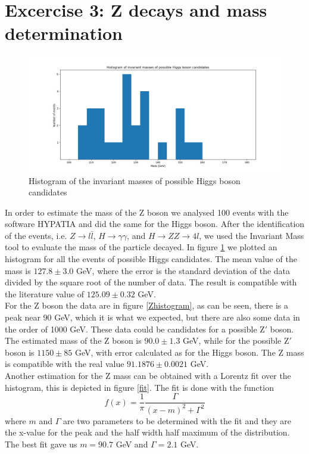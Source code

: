 \documentclass[a4paper,10pt]{article}
\begin{document}
\section{Excercise 3: Z decays and mass determination}
\begin{figure}[H]
\centering
\includegraphics[width =.8\textwidth]{img/higgs}
\caption{Histogram of the invariant masses of possible Higgs boson candidates}\label{higghistogram}
\end{figure}
In order to estimate the mass of the Z boson we analysed 100 events with the software HYPATIA and did the same for the Higgs boson. After the identification of the events, i.e. $Z \to l\bar{l}$, $H\to \gamma\gamma$, and $H\to ZZ\to4l$, we used the Invariant Mass tool to evaluate the mass of the particle decayed. In figure \ref{higghistogram} we plotted an histogram for all the events of possible Higgs candidates. The mean value of the mass is $127.8\pm 3.0$ GeV, where the error is the standard deviation of the data divided by the square root of the number of data. The result is compatible with the literature value \cite{masshiggs} of  $125.09\pm 0.32$ GeV.\\
For the Z boson the data are in figure \ref{Zhistogram}, as can be seen, there is a peak near 90 GeV, which it is what we expected, but there are also some data in the order of 1000 GeV. These data could be candidates for a possible Z$'$ boson. The estimated mass of the Z boson is $90.0\pm1.3$ GeV, while for the possible Z$'$ boson is $1150\pm85$ GeV, with error calculated as for the Higgs boson. The Z mass is compatible with the real value \cite{Zmass} $91.1876 \pm 0.0021$ GeV.\\
Another estimation for the Z mass can be obtained with a Lorentz fit over the histogram, this is depicted in figure \ref{fit}. The fit is done with the function
\[f(x) = \frac{1}{\pi}\frac{\Gamma}{(x-m)^2+\Gamma^2}\]
where $m$ and $\Gamma$ are two parameters to be determined with the fit and they are the x-value for the peak and the half width half maximum of the distribution. The best fit gave us $m = 90.7$ GeV and $\Gamma = 2.1$ GeV.
\end{document}
